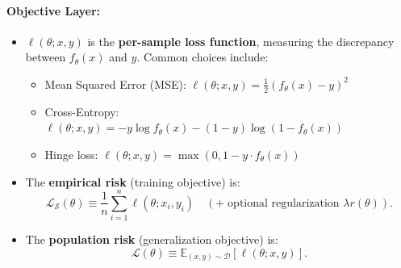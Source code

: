 \documentclass[
  journal=largetwo,
  simfonts=false,
  year=2025,
  volume=37,
]{cup-journal}
\begin{document}
\begin{setting}
\paragraph{Objective Layer:}
\begin{itemize}
    \item $\ell(\theta; x,y)$ is the \textbf{per-sample loss function}, measuring the discrepancy between $f_\theta(x)$ and $y$. Common choices include:
    \begin{itemize}
        \item Mean Squared Error (MSE): $\ell(\theta; x,y) = \frac{1}{2}(f_\theta(x) - y)^2$
        \item Cross-Entropy: $\ell(\theta; x,y) = -y\log f_\theta(x) - (1-y)\log(1-f_\theta(x))$
        \item Hinge loss: $\ell(\theta; x,y) = \max(0, 1 - y \cdot f_\theta(x))$
    \end{itemize}
    \item The \textbf{empirical risk} (training objective) is:
    \begin{equation}
        \mathcal{L}_{\mathcal{S}}(\theta) \equiv \frac{1}{n}\sum_{i=1}^n \ell(\theta; x_i,y_i)\quad (+\;\text{optional regularization } \lambda r(\theta)).
    \end{equation}
    \item The \textbf{population risk} (generalization objective) is:
    \begin{equation}
        \mathcal{L}(\theta)\equiv\mathbb{E}_{(x,y)\sim\mathcal{D}}[\ell(\theta;x,y)].
    \end{equation}
\end{itemize}


\end{setting}
\end{document}
